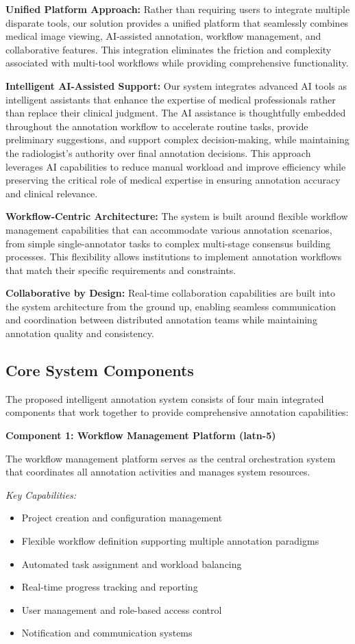 \textbf{Unified Platform Approach:} Rather than requiring users to integrate multiple disparate tools, our solution provides a unified platform that seamlessly combines medical image viewing, AI-assisted annotation, workflow management, and collaborative features. This integration eliminates the friction and complexity associated with multi-tool workflows while providing comprehensive functionality.

\textbf{Intelligent AI-Assisted Support:} Our system integrates advanced AI tools as intelligent assistants that enhance the expertise of medical professionals rather than replace their clinical judgment. The AI assistance is thoughtfully embedded throughout the annotation workflow to accelerate routine tasks, provide preliminary suggestions, and support complex decision-making, while maintaining the radiologist's authority over final annotation decisions. This approach leverages AI capabilities to reduce manual workload and improve efficiency while preserving the critical role of medical expertise in ensuring annotation accuracy and clinical relevance.

\textbf{Workflow-Centric Architecture:} The system is built around flexible workflow management capabilities that can accommodate various annotation scenarios, from simple single-annotator tasks to complex multi-stage consensus building processes. This flexibility allows institutions to implement annotation workflows that match their specific requirements and constraints.

\textbf{Collaborative by Design:} Real-time collaboration capabilities are built into the system architecture from the ground up, enabling seamless communication and coordination between distributed annotation teams while maintaining annotation quality and consistency.

\subsection{Core System Components}

The proposed intelligent annotation system consists of four main integrated components that work together to provide comprehensive annotation capabilities:

\textbf{Component 1: Workflow Management Platform (latn-5)}

The workflow management platform serves as the central orchestration system that coordinates all annotation activities and manages system resources.

\textit{Key Capabilities:}
\begin{itemize}
    \item Project creation and configuration management
    \item Flexible workflow definition supporting multiple annotation paradigms
    \item Automated task assignment and workload balancing
    \item Real-time progress tracking and reporting
    \item User management and role-based access control
    \item Notification and communication systems
\end{itemize}

